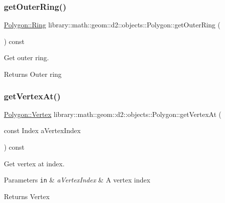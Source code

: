 \subsubsection{\texorpdfstring{get\+Outer\+Ring()}{getOuterRing()}}
{\footnotesize\ttfamily \hyperlink{classlibrary_1_1math_1_1geom_1_1d2_1_1objects_1_1_polygon_aa543e7078b73e1d307ca8317d765cd9c}{Polygon\+::\+Ring} library\+::math\+::geom\+::d2\+::objects\+::\+Polygon\+::get\+Outer\+Ring (\begin{DoxyParamCaption}{ }\end{DoxyParamCaption}) const}



Get outer ring. 

\begin{DoxyReturn}{Returns}
Outer ring 
\end{DoxyReturn}
\mbox{\label{classlibrary_1_1math_1_1geom_1_1d2_1_1objects_1_1_polygon_a3d592373be3ef2a722cfd70935f47832}} 
\subsubsection{\texorpdfstring{get\+Vertex\+At()}{getVertexAt()}}
{\footnotesize\ttfamily \hyperlink{classlibrary_1_1math_1_1geom_1_1d2_1_1objects_1_1_polygon_a1559cddbcb23d41f2be9e389b0ccd127}{Polygon\+::\+Vertex} library\+::math\+::geom\+::d2\+::objects\+::\+Polygon\+::get\+Vertex\+At (\begin{DoxyParamCaption}\item[{const Index}]{a\+Vertex\+Index }\end{DoxyParamCaption}) const}



Get vertex at index. 


\begin{DoxyParams}[1]{Parameters}
\mbox{\tt in}  & {\em a\+Vertex\+Index} & A vertex index \\
\hline
\end{DoxyParams}
\begin{DoxyReturn}{Returns}
Vertex 
\end{DoxyReturn}
\mbox{\label{classlibrary_1_1math_1_1geom_1_1d2_1_1objects_1_1_polygon_aece2a526c36bbd641588e9742228fb08}} 
